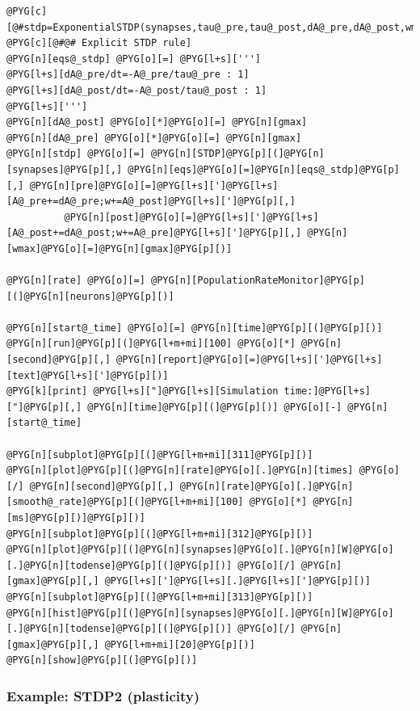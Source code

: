 \documentclass[letterpaper,10pt,english]{manual}
\begin{document}
\begin{Verbatim}[commandchars=@\[\]]
@PYG[c][@#stdp=ExponentialSTDP(synapses,tau@_pre,tau@_post,dA@_pre,dA@_post,wmax=gmax)]
@PYG[c][@#@# Explicit STDP rule]
@PYG[n][eqs@_stdp] @PYG[o][=] @PYG[l+s][''']
@PYG[l+s][dA@_pre/dt=-A@_pre/tau@_pre : 1]
@PYG[l+s][dA@_post/dt=-A@_post/tau@_post : 1]
@PYG[l+s][''']
@PYG[n][dA@_post] @PYG[o][*]@PYG[o][=] @PYG[n][gmax]
@PYG[n][dA@_pre] @PYG[o][*]@PYG[o][=] @PYG[n][gmax]
@PYG[n][stdp] @PYG[o][=] @PYG[n][STDP]@PYG[p][(]@PYG[n][synapses]@PYG[p][,] @PYG[n][eqs]@PYG[o][=]@PYG[n][eqs@_stdp]@PYG[p][,] @PYG[n][pre]@PYG[o][=]@PYG[l+s][']@PYG[l+s][A@_pre+=dA@_pre;w+=A@_post]@PYG[l+s][']@PYG[p][,]
          @PYG[n][post]@PYG[o][=]@PYG[l+s][']@PYG[l+s][A@_post+=dA@_post;w+=A@_pre]@PYG[l+s][']@PYG[p][,] @PYG[n][wmax]@PYG[o][=]@PYG[n][gmax]@PYG[p][)]

@PYG[n][rate] @PYG[o][=] @PYG[n][PopulationRateMonitor]@PYG[p][(]@PYG[n][neurons]@PYG[p][)]

@PYG[n][start@_time] @PYG[o][=] @PYG[n][time]@PYG[p][(]@PYG[p][)]
@PYG[n][run]@PYG[p][(]@PYG[l+m+mi][100] @PYG[o][*] @PYG[n][second]@PYG[p][,] @PYG[n][report]@PYG[o][=]@PYG[l+s][']@PYG[l+s][text]@PYG[l+s][']@PYG[p][)]
@PYG[k][print] @PYG[l+s]["]@PYG[l+s][Simulation time:]@PYG[l+s]["]@PYG[p][,] @PYG[n][time]@PYG[p][(]@PYG[p][)] @PYG[o][-] @PYG[n][start@_time]

@PYG[n][subplot]@PYG[p][(]@PYG[l+m+mi][311]@PYG[p][)]
@PYG[n][plot]@PYG[p][(]@PYG[n][rate]@PYG[o][.]@PYG[n][times] @PYG[o][/] @PYG[n][second]@PYG[p][,] @PYG[n][rate]@PYG[o][.]@PYG[n][smooth@_rate]@PYG[p][(]@PYG[l+m+mi][100] @PYG[o][*] @PYG[n][ms]@PYG[p][)]@PYG[p][)]
@PYG[n][subplot]@PYG[p][(]@PYG[l+m+mi][312]@PYG[p][)]
@PYG[n][plot]@PYG[p][(]@PYG[n][synapses]@PYG[o][.]@PYG[n][W]@PYG[o][.]@PYG[n][todense]@PYG[p][(]@PYG[p][)] @PYG[o][/] @PYG[n][gmax]@PYG[p][,] @PYG[l+s][']@PYG[l+s][.]@PYG[l+s][']@PYG[p][)]
@PYG[n][subplot]@PYG[p][(]@PYG[l+m+mi][313]@PYG[p][)]
@PYG[n][hist]@PYG[p][(]@PYG[n][synapses]@PYG[o][.]@PYG[n][W]@PYG[o][.]@PYG[n][todense]@PYG[p][(]@PYG[p][)] @PYG[o][/] @PYG[n][gmax]@PYG[p][,] @PYG[l+m+mi][20]@PYG[p][)]
@PYG[n][show]@PYG[p][(]@PYG[p][)]
\end{Verbatim}

\resetcurrentobjects
\hypertarget{--doc-examples-plasticity_STDP2}{}

\hypertarget{index-77}{}\subsubsection{Example: STDP2 (plasticity)}
\end{document}
